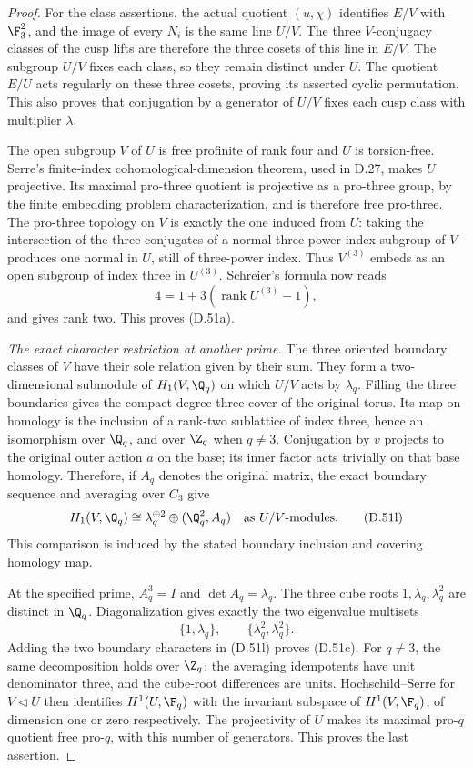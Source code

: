 \begin{proof}
For the class assertions, the actual quotient
$(u,\chi)$ identifies $E/V$ with $\F_3^2$,
and the image of every $N_i$ is the same
line $U/V$.
The three $V$-conjugacy classes of the cusp
lifts are therefore the three cosets of this
line in $E/V$. The subgroup $U/V$ fixes each
class, so they remain distinct under $U$.
The quotient $E/U$ acts regularly on these
three cosets, proving its asserted cyclic
permutation. This also proves that conjugation
by a generator of $U/V$ fixes each cusp
class with multiplier $\lambda$.

The open subgroup $V$ of $U$ is free profinite
of rank four and $U$ is torsion-free.
Serre's finite-index cohomological-dimension
theorem, used in D.27, makes $U$ projective.
Its maximal pro-three quotient is projective
as a pro-three group, by the finite embedding
problem characterization, and is therefore
free pro-three.
The pro-three topology on $V$ is exactly the
one induced from $U$: taking the intersection
of the three conjugates of a normal
three-power-index subgroup of $V$ produces
one normal in $U$, still of three-power index.
Thus $V^{(3)}$ embeds as an open subgroup
of index three in $U^{(3)}$.
Schreier's formula now reads
\[
                 4=1+3(\operatorname{rank}U^{(3)}-1),
\]
and gives rank two. This proves (D.51a).

\emph{The exact character restriction at another prime.}
The three oriented boundary classes of $V$
have their sole relation given by their sum.
They form a two-dimensional submodule of
$H_1(V,\Q_q)$ on which $U/V$ acts by
$\lambda_q$.
Filling the three boundaries gives the compact
degree-three cover of the original torus.
Its map on homology is the inclusion of a
rank-two sublattice of index three, hence an
isomorphism over $\Q_q$, and over $\Z_q$
when $q\ne3$.
Conjugation by $v$ projects to the original
outer action $a$ on the base; its inner
factor acts trivially on that base homology.
Therefore, if $A_q$ denotes the original
matrix, the exact boundary sequence and
averaging over $C_3$ give
\[
       H_1(V,\Q_q)\cong
                  \lambda_q^{\oplus2}
                    \oplus(\Q_q^2,A_q)
                 \quad\hbox{as }U/V\hbox{-modules}.
                                                        \tag{D.51l}
\]
This comparison is induced by the stated
boundary inclusion and covering homology map.

At the specified prime, $A_q^3=I$ and
$\det A_q=\lambda_q$.
The three cube roots $1,\lambda_q,\lambda_q^2$
are distinct in $\Q_q$. Diagonalization gives
exactly the two eigenvalue multisets
\[
                 \{1,\lambda_q\},\qquad
                 \{\lambda_q^2,\lambda_q^2\}.
                                                        \tag{D.51m}
\]
Adding the two boundary characters in (D.51l)
proves (D.51c).
For $q\ne3$, the same decomposition holds
over $\Z_q$: the averaging idempotents have
unit denominator three, and the cube-root
differences are units.
Hochschild--Serre for $V\triangleleft U$ then
identifies $H^1(U,\F_q)$ with the invariant
subspace of $H^1(V,\F_q)$, of dimension one
or zero respectively.
The projectivity of $U$ makes its maximal
pro-$q$ quotient free pro-$q$, with this
number of generators. This proves the last
assertion.


\end{proof}
